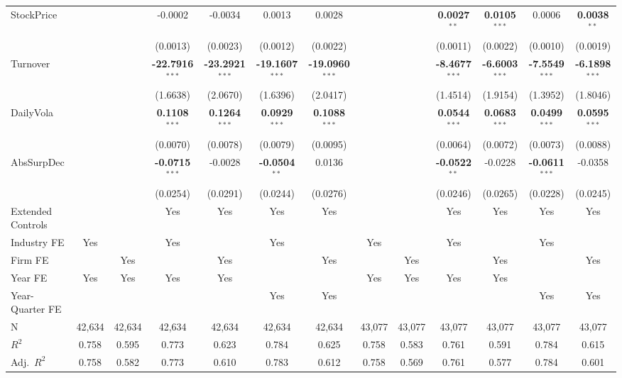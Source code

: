 \begin{landscape}
\begin{table}[H]
\begin{tabular}{lcccccccccccc}
StockPrice &  &  & -0.0002 & -0.0034 & 0.0013 & 0.0028 &  &  & \textbf{0.0027}$^{**}$ & \textbf{0.0105}$^{***}$ & 0.0006 & \textbf{0.0038}$^{**}$ \\
 &  &  & (0.0013) & (0.0023) & (0.0012) & (0.0022) &  &  & (0.0011) & (0.0022) & (0.0010) & (0.0019) \\
Turnover &  &  & \textbf{-22.7916}$^{***}$ & \textbf{-23.2921}$^{***}$ & \textbf{-19.1607}$^{***}$ & \textbf{-19.0960}$^{***}$ &  &  & \textbf{-8.4677}$^{***}$ & \textbf{-6.6003}$^{***}$ & \textbf{-7.5549}$^{***}$ & \textbf{-6.1898}$^{***}$ \\
 &  &  & (1.6638) & (2.0670) & (1.6396) & (2.0417) &  &  & (1.4514) & (1.9154) & (1.3952) & (1.8046) \\
DailyVola &  &  & \textbf{0.1108}$^{***}$ & \textbf{0.1264}$^{***}$ & \textbf{0.0929}$^{***}$ & \textbf{0.1088}$^{***}$ &  &  & \textbf{0.0544}$^{***}$ & \textbf{0.0683}$^{***}$ & \textbf{0.0499}$^{***}$ & \textbf{0.0595}$^{***}$ \\
 &  &  & (0.0070) & (0.0078) & (0.0079) & (0.0095) &  &  & (0.0064) & (0.0072) & (0.0073) & (0.0088) \\
AbsSurpDec &  &  & \textbf{-0.0715}$^{***}$ & -0.0028 & \textbf{-0.0504}$^{**}$ & 0.0136 &  &  & \textbf{-0.0522}$^{**}$ & -0.0228 & \textbf{-0.0611}$^{***}$ & -0.0358 \\
 &  &  & (0.0254) & (0.0291) & (0.0244) & (0.0276) &  &  & (0.0246) & (0.0265) & (0.0228) & (0.0245) \\
\midrule
Extended Controls &  &  & Yes & Yes & Yes & Yes &  &  & Yes & Yes & Yes & Yes \\
Industry FE & Yes &  & Yes &  & Yes &  & Yes &  & Yes &  & Yes &  \\
Firm FE &  & Yes &  & Yes &  & Yes &  & Yes &  & Yes &  & Yes \\
Year FE & Yes & Yes & Yes & Yes &  &  & Yes & Yes & Yes & Yes &  &  \\
Year-Quarter FE &  &  &  &  & Yes & Yes &  &  &  &  & Yes & Yes \\
\midrule
N & 42,634 & 42,634 & 42,634 & 42,634 & 42,634 & 42,634 & 43,077 & 43,077 & 43,077 & 43,077 & 43,077 & 43,077 \\
$R^2$ & 0.758 & 0.595 & 0.773 & 0.623 & 0.784 & 0.625 & 0.758 & 0.583 & 0.761 & 0.591 & 0.784 & 0.615 \\
Adj.~$R^2$ & 0.758 & 0.582 & 0.773 & 0.610 & 0.783 & 0.612 & 0.758 & 0.569 & 0.761 & 0.577 & 0.784 & 0.601 \\
\bottomrule
\end{tabular}

\end{table}
\end{landscape}
